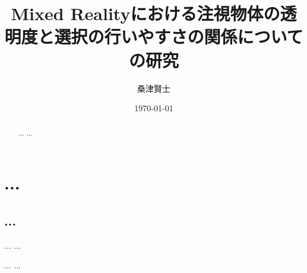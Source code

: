 \documentclass[a4j,10pt,oneside,openany]{jsbook}
\title{{\Huge \textbf{Mixed Realityにおける注視物体の透明度と選択の行いやすさの関係についての研究
}}\\ }
\author{桑津賢士}
\date{\today}
\begin{document}
%
%
\maketitle
\frontmatter
\tableofcontents
%
%
\mainmatter

\chapter{...}
\begin{abstract}
...
...
\end{abstract}

\section{...}
...
...

\begin{thebibliography}{20}
 ...
 ...
\end{thebibliography}

\newpage
\printindex
%
%
\end{document}

